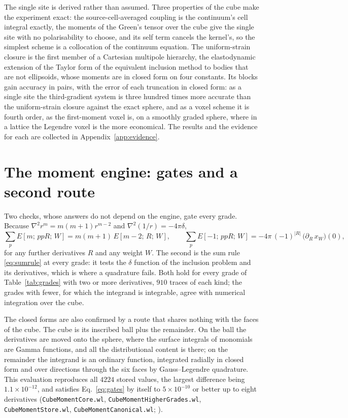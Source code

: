\documentclass[11pt,a4paper]{article}
\newcommand{\nb}[1]{\texttt{#1}}
\begin{document}
The single site is derived rather than assumed. Three properties of the cube make the experiment
exact: the source-cell-averaged coupling is the continuum's cell integral exactly, the moments of the
Green's tensor over the cube give the single site with no polarisability to choose, and its self term
cancels the kernel's, so the simplest scheme is a collocation of the continuum equation. The
uniform-strain closure is the first member of a Cartesian multipole hierarchy, the elastodynamic
extension of the
Taylor form of the equivalent inclusion method \citep{Moschovidis1975} to bodies that are not
ellipsoids, whose moments are in closed form on four constants. Its blocks gain accuracy in pairs,
with the error of each truncation in closed form: as a single site the third-gradient system is three
hundred times more accurate than the uniform-strain closure against the exact sphere, and as a voxel
scheme it is fourth order, as the first-moment voxel is, on a smoothly graded sphere, where in a lattice
the Legendre voxel is the more economical. The results and the evidence for each are collected in
Appendix~\ref{app:evidence}.

\appendix

\section{The moment engine: gates and a second route}\label{app:engine}

Two checks, whose answers do not depend on the engine, gate every grade. Because
$\nabla^2r^m=m(m+1)r^{m-2}$ and $\nabla^2(1/r)=-4\pi\delta$,
\begin{equation}\label{eq:gates}
  \sum_pE[m;\,ppR;\,W]=m(m+1)\,E[m-2;\,R;\,W],\qquad
  \sum_pE[-1;\,ppR;\,W]=-4\pi\,(-1)^{|R|}\,\bigl(\partial_R\,x_W\bigr)(0),
\end{equation}
for any further derivatives $R$ and any weight $W$. The second is the sum rule \eqref{eq:sumrule} at
every grade: it tests the $\delta$ function of the inclusion problem and its derivatives, which is
where a quadrature fails. Both hold for every grade of Table~\ref{tab:grades} with two or more
derivatives, $910$ traces of each kind; the grades with fewer, for which the integrand is integrable,
agree with numerical integration over the cube.

The closed forms are also confirmed by a route that shares nothing with the faces of the cube. The
cube is its inscribed ball plus the remainder. On the ball the derivatives are moved onto the sphere,
where the surface integrals of monomials are Gamma functions, and all the distributional content is
there; on the remainder the integrand is an ordinary function, integrated radially in closed form and
over directions through the six faces by Gauss--Legendre quadrature. This evaluation reproduces all
$4224$ stored values, the largest difference being $1.1\times10^{-12}$, and satisfies
Eq.~\eqref{eq:gates} by itself to $5\times10^{-10}$ or better up to eight derivatives
(\nb{CubeMomentCore.wl}, \nb{CubeMomentHigherGrades.wl}, \nb{CubeMomentStore.wl},
\nb{CubeMomentCanonical.wl}; ).
\end{document}

